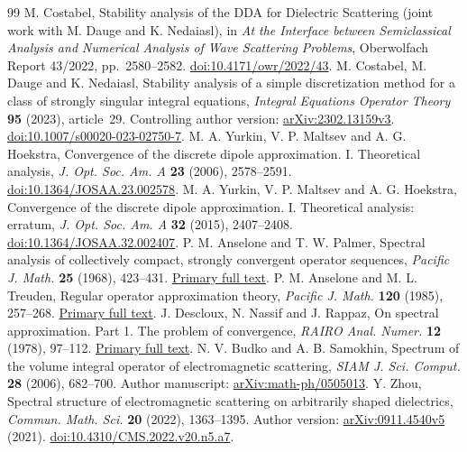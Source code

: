 \documentclass[11pt]{article}
\theoremstyle{remark}\newtheorem{remark}[theorem]{Remark}
\begin{document}
\begin{thebibliography}{99}
 M. Costabel, Stability analysis of the DDA for Dielectric Scattering (joint work with M. Dauge and K. Nedaiasl), in \emph{At the Interface between Semiclassical Analysis and Numerical Analysis of Wave Scattering Problems}, Oberwolfach Report 43/2022, pp.~2580--2582. \href{https://doi.org/10.4171/owr/2022/43}{doi:10.4171/owr/2022/43}.
 M. Costabel, M. Dauge and K. Nedaiasl, Stability analysis of a simple discretization method for a class of strongly singular integral equations, \emph{Integral Equations Operator Theory} \textbf{95} (2023), article~29. Controlling author version: \href{https://arxiv.org/abs/2302.13159v3}{arXiv:2302.13159v3}. \href{https://doi.org/10.1007/s00020-023-02750-7}{doi:10.1007/s00020-023-02750-7}.
 M. A. Yurkin, V. P. Maltsev and A. G. Hoekstra, Convergence of the discrete dipole approximation. I. Theoretical analysis, \emph{J. Opt. Soc. Am. A} \textbf{23} (2006), 2578--2591. \href{https://doi.org/10.1364/JOSAA.23.002578}{doi:10.1364/JOSAA.23.002578}.
 M. A. Yurkin, V. P. Maltsev and A. G. Hoekstra, Convergence of the discrete dipole approximation. I. Theoretical analysis: erratum, \emph{J. Opt. Soc. Am. A} \textbf{32} (2015), 2407--2408. \href{https://doi.org/10.1364/JOSAA.32.002407}{doi:10.1364/JOSAA.32.002407}.
 P. M. Anselone and T. W. Palmer, Spectral analysis of collectively compact, strongly convergent operator sequences, \emph{Pacific J. Math.} \textbf{25} (1968), 423--431. \href{https://msp.org/pjm/1968/25-3/pjm-v25-n3-p02-p.pdf}{Primary full text}.
 P. M. Anselone and M. L. Treuden, Regular operator approximation theory, \emph{Pacific J. Math.} \textbf{120} (1985), 257--268. \href{https://msp.org/pjm/1985/120-2/pjm-v120-n2-p01-p.pdf}{Primary full text}.
 J. Descloux, N. Nassif and J. Rappaz, On spectral approximation. Part 1. The problem of convergence, \emph{RAIRO Anal. Numer.} \textbf{12} (1978), 97--112. \href{https://www.numdam.org/article/M2AN_1978__12_2_97_0.pdf}{Primary full text}.
 N. V. Budko and A. B. Samokhin, Spectrum of the volume integral operator of electromagnetic scattering, \emph{SIAM J. Sci. Comput.} \textbf{28} (2006), 682--700. Author manuscript: \href{https://arxiv.org/abs/math-ph/0505013}{arXiv:math-ph/0505013}.
 Y. Zhou, Spectral structure of electromagnetic scattering on arbitrarily shaped dielectrics, \emph{Commun. Math. Sci.} \textbf{20} (2022), 1363--1395. Author version: \href{https://arxiv.org/abs/0911.4540v5}{arXiv:0911.4540v5} (2021). \href{https://doi.org/10.4310/CMS.2022.v20.n5.a7}{doi:10.4310/CMS.2022.v20.n5.a7}.

\end{thebibliography}
\end{document}
